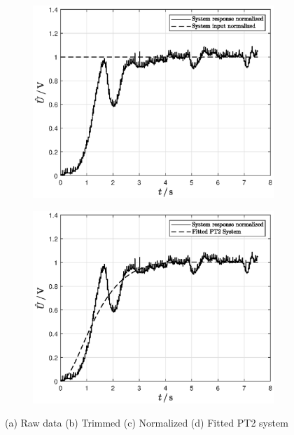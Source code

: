 \begin{figure}[ht]
    \hfill
    
    \begin{subfigure}[b]{0.45\textwidth}
    \includegraphics[width=\textwidth]{figure/normalize.eps}
    \caption{}
    \label{subfig:normalize}
    \end{subfigure}
    \begin{subfigure}[b]{0.45\textwidth}
    \includegraphics[width=\textwidth]{figure/fitting.eps}
    \caption{}
    \label{subfig:fitting}
    \end{subfigure}

    \hfill
    
    \caption[System identification in the laboratory]{(a) Raw data (b) Trimmed (c) Normalized (d) Fitted PT2 system}
\end{figure}
\FloatBarrier

